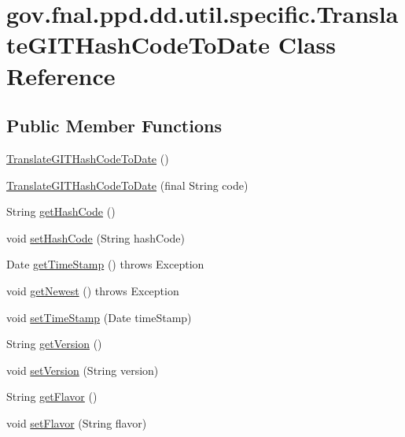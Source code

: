 \hypertarget{classgov_1_1fnal_1_1ppd_1_1dd_1_1util_1_1specific_1_1TranslateGITHashCodeToDate}{\section{gov.\-fnal.\-ppd.\-dd.\-util.\-specific.\-Translate\-G\-I\-T\-Hash\-Code\-To\-Date Class Reference}
\label{classgov_1_1fnal_1_1ppd_1_1dd_1_1util_1_1specific_1_1TranslateGITHashCodeToDate}
}
\subsection*{Public Member Functions}
\begin{DoxyCompactItemize}
\item 
\hyperlink{classgov_1_1fnal_1_1ppd_1_1dd_1_1util_1_1specific_1_1TranslateGITHashCodeToDate_a2d9b93752fc286129e67c98556b0c634}{Translate\-G\-I\-T\-Hash\-Code\-To\-Date} ()
\item 
\hyperlink{classgov_1_1fnal_1_1ppd_1_1dd_1_1util_1_1specific_1_1TranslateGITHashCodeToDate_aa091fef236c815b679388cbe83048b6b}{Translate\-G\-I\-T\-Hash\-Code\-To\-Date} (final String code)
\item 
String \hyperlink{classgov_1_1fnal_1_1ppd_1_1dd_1_1util_1_1specific_1_1TranslateGITHashCodeToDate_a541c4eab3fd282417775f82bc170a45f}{get\-Hash\-Code} ()
\item 
void \hyperlink{classgov_1_1fnal_1_1ppd_1_1dd_1_1util_1_1specific_1_1TranslateGITHashCodeToDate_ae4e0b19867598bff559ace63d4742a09}{set\-Hash\-Code} (String hash\-Code)
\item 
Date \hyperlink{classgov_1_1fnal_1_1ppd_1_1dd_1_1util_1_1specific_1_1TranslateGITHashCodeToDate_a1f419f8fad89c657344d3d4360b35f8c}{get\-Time\-Stamp} ()  throws Exception 
\item 
void \hyperlink{classgov_1_1fnal_1_1ppd_1_1dd_1_1util_1_1specific_1_1TranslateGITHashCodeToDate_aee2f148a3a99bf1915376b781887fad4}{get\-Newest} ()  throws Exception 
\item 
void \hyperlink{classgov_1_1fnal_1_1ppd_1_1dd_1_1util_1_1specific_1_1TranslateGITHashCodeToDate_afa90256edb906d24dac33e4bc1e74997}{set\-Time\-Stamp} (Date time\-Stamp)
\item 
String \hyperlink{classgov_1_1fnal_1_1ppd_1_1dd_1_1util_1_1specific_1_1TranslateGITHashCodeToDate_ad4674ae96db7ac14e7f164090be5dfb1}{get\-Version} ()
\item 
void \hyperlink{classgov_1_1fnal_1_1ppd_1_1dd_1_1util_1_1specific_1_1TranslateGITHashCodeToDate_a7a65833daf1de4a382021e81f7f7c3d6}{set\-Version} (String version)
\item 
String \hyperlink{classgov_1_1fnal_1_1ppd_1_1dd_1_1util_1_1specific_1_1TranslateGITHashCodeToDate_a11f32d155097fc3bf3cd68aafd113072}{get\-Flavor} ()
\item 
void \hyperlink{classgov_1_1fnal_1_1ppd_1_1dd_1_1util_1_1specific_1_1TranslateGITHashCodeToDate_a4f142b3b8950000d9e818bcc4d2a87c5}{set\-Flavor} (String flavor)
\end{DoxyCompactItemize}
